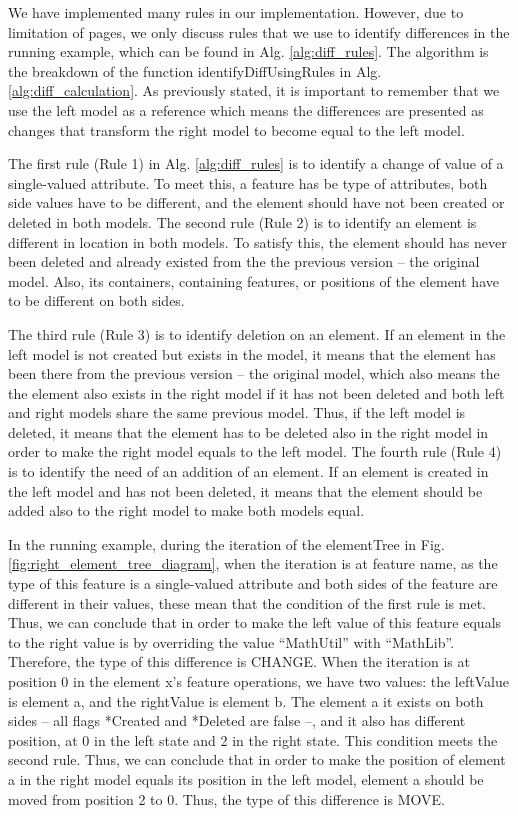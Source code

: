 \documentclass{jot}
\begin{document}
We have implemented many rules in our implementation. However, due to limitation of pages, we only discuss rules that we use to identify differences in the running example, which can be found in Alg. \ref{alg:diff_rules}. The algorithm is the breakdown of the function \textsf{identifyDiffUsingRules} in Alg. \ref{alg:diff_calculation}. As previously stated, it is important to remember that we use the left model as a reference which means the differences are presented as changes that transform the right model to become equal to the left model. 


The first rule (Rule 1) in Alg. \ref{alg:diff_rules} is to identify a change of value of a single-valued attribute. To meet this, a feature has be type of attributes, both side values have to be different, and the element should have not been created or deleted in both models. The second rule (Rule 2) is to identify an element is different in location in both models. To satisfy this, the element should has never been deleted and already existed from the the previous version -- the original model. Also, its containers, containing features, or positions of the element have to be different on both sides.

The third rule (Rule 3)  is to identify deletion on an element. If an element in the left model is not created but exists in the model, it means that the element has been there from the previous version -- the original model, which also means the the element also exists in the right model if it has not been deleted and both left and right models share the same previous model. Thus, if the left model is deleted, it means that the element has to be deleted also in the right model in order to make the right model equals to the left model. The fourth rule (Rule 4) is to identify the need of an addition of an element. If an element is created in the left model and has not been deleted, it means that the element should be added also to the right model to make both models equal.

In the running example, during the iteration of the \textsf{elementTree} in Fig. \ref{fig:right_element_tree_diagram}, when the iteration is at feature \textsf{name}, as the type of this feature is a single-valued attribute and both sides of the feature are different in their values, these mean that the condition of the first rule is met. Thus, we can conclude that in order to make the left value of this feature equals to the right value is by overriding the value ``MathUtil'' with ``MathLib''. Therefore, the type of this difference is \textsf{CHANGE}. When the iteration is at position 0 in the element \textsf{x}'s feature \textsf{operations}, we have two values: the \textsf{leftValue} is element \textsf{a}, and the \textsf{rightValue} is element \textsf{b}. The element \textsf{a} it exists on both sides -- all flags \textsf{*Created} and \textsf{*Deleted} are false --, and it also has different position, at 0 in the left state and 2 in the right state. This condition meets the second rule. Thus, we can conclude that in order to make the position of element \textsf{a} in the right model equals its position in the left model, element \textsf{a} should be moved from position 2 to 0. Thus, the type of this difference is \textsf{MOVE}. 
\end{document}
